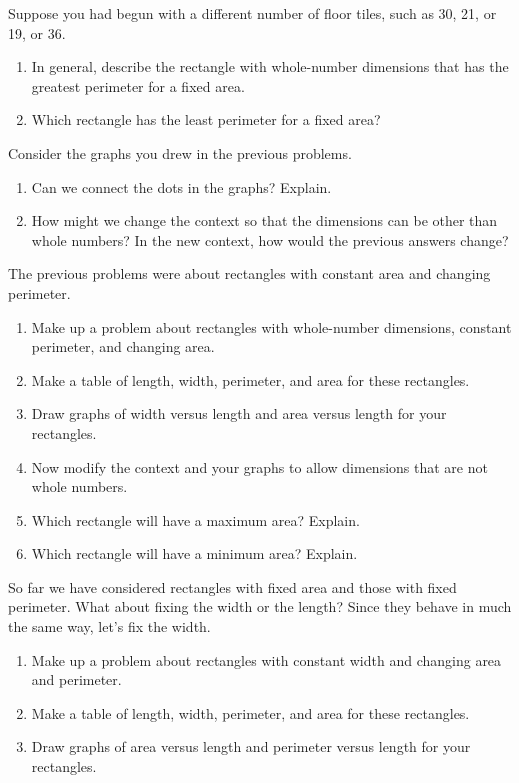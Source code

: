 \begin{prob}
Suppose you had begun with a different number of floor tiles, such as 30, 21, or 19, or 36.  
\begin{enumerate}
\item In general, describe the rectangle with whole-number dimensions that has the greatest perimeter for a fixed area.  
\item Which rectangle has the least perimeter for a fixed area?
\end{enumerate}
\end{prob}

\begin{prob}  Consider the graphs you drew in the previous problems.  
\begin{enumerate}
\item Can we connect the dots in the graphs?  Explain. 
\item How might we change the context so that the dimensions can be other than whole numbers?   In the new context, how would the previous answers change?
\end{enumerate}
\end{prob}

\begin{prob}
The previous problems were about rectangles with constant area and changing perimeter.  
\begin{enumerate}
\item Make up a problem about rectangles with whole-number dimensions, constant perimeter, and changing area.   
\item Make a table of length, width, perimeter, and area for these rectangles.
\item Draw graphs of width versus length and area versus length for your rectangles.  
\item Now modify the context and your graphs to allow dimensions that are not whole numbers.   
\item Which rectangle will have a maximum area?  Explain.
\item Which rectangle will have a minimum area?  Explain.
\end{enumerate}
\end{prob}

\begin{prob}
So far we have considered rectangles with fixed area and those with fixed perimeter.  What about fixing the width or the length?  Since they behave in much the same way, let's fix the width.   
\begin{enumerate}
\item Make up a problem about rectangles with constant width and changing area and perimeter.   
\item Make a table of length, width, perimeter, and area for these rectangles.
\item Draw graphs of area versus length and perimeter versus length for your rectangles. 
\end{enumerate}
\end{prob}

